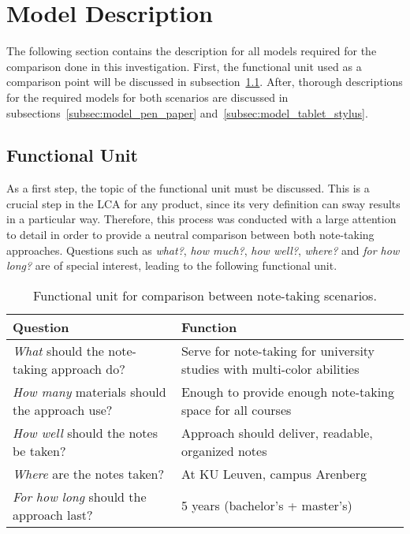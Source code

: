 \section{Model Description}\label{sec:model_description}
The following section contains the description for all models required for the comparison done in this investigation. First, the functional unit used as a comparison point will be discussed in subsection~\ref{subsec:functional_unit}. After, thorough descriptions for the required models for both scenarios are discussed in subsections~\ref{subsec:model_pen_paper} and~\ref{subsec:model_tablet_stylus}.


\subsection{Functional Unit}\label{subsec:functional_unit}
As a first step, the topic of the functional unit must be discussed. This is a crucial step in the LCA for any product, since its very definition can sway results in a particular way. Therefore, this process was conducted with a large attention to detail in order to provide a neutral comparison between both note-taking approaches. Questions such as \textit{what?}, \textit{how much?}, \textit{how well?}, \textit{where?} and \textit{for how long?} are of special interest, leading to the following functional unit.

\renewcommand{\arraystretch}{1.5}
\begin{table}[H]
    \centering
    \begin{tabular}{M{0.4\textwidth}|M{0.5\textwidth}}
        Question & Function \\
        \hline
        \hline
        \textit{What} should the note-taking approach do?            &   Serve for note-taking for university studies with multi-color abilities\\
        \hline
        \textit{How many} materials should the approach use?         &   Enough to provide enough note-taking space for all courses\\
        \hline
        \textit{How well} should the notes be taken?                 &   Approach should deliver, readable, organized notes\\
        \hline
        \textit{Where} are the notes taken?                          &   At KU Leuven, campus Arenberg\\
        \hline
        \textit{For how long} should the approach last?              &   5 years (bachelor's + master's)
    \end{tabular}
    \caption{Functional unit for comparison between note-taking scenarios.}
    \label{tab:functional_unit}
\end{table}
\renewcommand{\arraystretch}{1}

